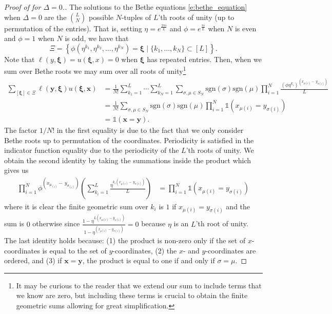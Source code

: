 \documentclass[a4paper,11pt]{article}
\theoremstyle{definition}
\begin{document}
\begin{proof}[Proof of  for $\Delta =0$.]
The solutions to the Bethe equations \eqref{e:bethe_equation} when $\Delta=0$ are the $\binom{L}{N}$ possible $N$-tuples of $L$'th roots of unity (up to permutation of the entries). That is, setting $\eta=e^{\frac{2\pi i}{L}}$ and $\phi=e^{\frac{\pi i}{L}}$ when $N$ is even and $\phi=1$ when $N$ is odd, we have that 
\begin{equation}
    \Xi=\left\{\phi\left(\eta^{k_1},\eta^{k_2},\ldots,\eta^{k_N}\right)=\boldsymbol{\xi} \mid \{k_1,\ldots,k_N\}\subset [L] \right\}.
\end{equation}
Note that $\ell(y,\boldsymbol{\xi})= u(\boldsymbol{\xi},x)=0$ when $\boldsymbol{\xi}$ has repeated entries. Then, when we sum over Bethe roots we may sum over all roots of unity\footnote{It may be curious to the reader that we extend our sum to include terms that we know are zero, but including these terms is crucial to obtain the finite geometric sums allowing for great simplification.} 
\begin{equation}
\begin{split}
\sum_{[\boldsymbol{\xi}] \in \Xi} \ell(\mathbf{y},\boldsymbol{\xi})u(\boldsymbol{\xi},\mathbf{x}) &= \frac{1}{N!}\sum_{k_1=1}^L \cdots \sum_{k_N=1}^L \sum_{\sigma, \mu\in S_N} \mathrm{sgn}(\sigma)\mathrm{sgn}(\mu) \prod_{i=1}^N\frac{\left(\phi\eta^{k_i}\right)^{(x_{\mu(i)}-\,y_{\sigma(i)})}}{L}\\
&= \frac{1}{N!} \sum_{\sigma, \mu \in S_N} \mathrm{sgn}(\sigma)\mathrm{sgn}(\mu)\prod_{i=1}^N\mathds{1}(x_{\mu(i)}=y_{\sigma(i)})\\
&=\mathds{1}(\mathbf{x} = \mathbf{y}).
\end{split}
\end{equation}
The factor $1/N!$ in the first equality is due to the fact that we only consider Bethe roots up to permutation of the coordinates. Periodicity is satisfied in the indicator function equality due to the periodicity of the $L$'th roots of unity. We obtain the second identity by taking the summations inside the product which gives us 
\begin{equation}
    \begin{split}
        \prod_{i=1}^N\phi^{(x_{\mu_{(i)}}-\,y_{\sigma_{(i)}})}\left(\sum_{k_i=1}^L\frac{\eta^{k_i(x_{\mu(i)}-\,y_{\sigma(i)})}}{L}\right)  &= \prod_{i=1}^N\mathds{1}(x_{\mu(i)}=y_{\sigma(i)}) 
    \end{split}
\end{equation}
where it is clear the finite geometric sum over $k_i$ is $1$ if $x_{\mu(i)}=y_{\sigma(i)}$ and the sum is $0$ otherwise since $\frac{1-\eta^{L(x_{\mu(i)}-y_{\sigma(i)})}}{1-\eta^{(x_{\mu(i)}-y_{\sigma(i)})}} =0$ because $\eta$ is an $L$'th root of unity.  
The last identity holds because: (1) the product is non-zero only if the set of $x$-coordinates is equal to the set of $y$-coordinates, (2) the $x$- and $y$-coordinates are ordered, and (3) if $\mathbf{x} = \mathbf{y}$, the product is equal to one if and only if $\sigma = \mu$.

\end{proof}
\end{document}
